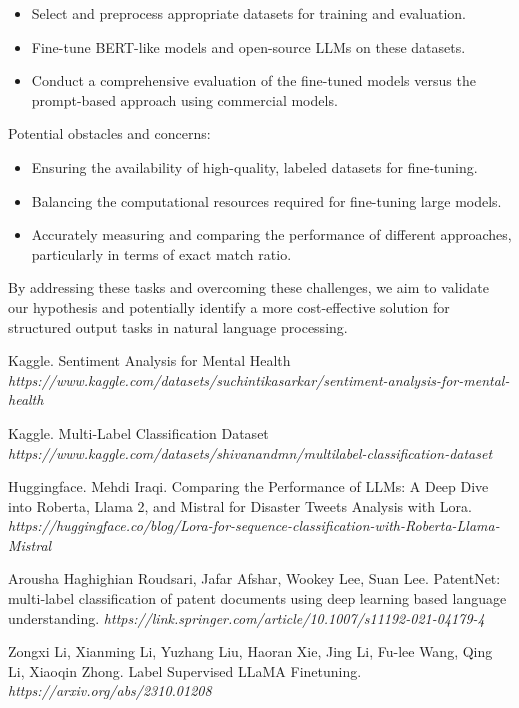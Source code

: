 \documentclass[11pt]{article}
\begin{document}
\begin{itemize}
    \item Select and preprocess appropriate datasets for training and evaluation.
    \item Fine-tune BERT-like models and open-source LLMs on these datasets.
    \item Conduct a comprehensive evaluation of the fine-tuned models versus the prompt-based approach using commercial models.
\end{itemize}
Potential obstacles and concerns:

\begin{itemize}
    \item Ensuring the availability of high-quality, labeled datasets for fine-tuning.
    \item Balancing the computational resources required for fine-tuning large models.
    \item Accurately measuring and comparing the performance of different approaches, particularly in terms of exact match ratio.
\end{itemize}
By addressing these tasks and overcoming these challenges, we aim to validate our hypothesis and potentially identify a more cost-effective solution for structured output tasks in natural language processing.

\begin{thebibliography}{}

Kaggle. Sentiment Analysis for Mental Health \textit{https://www.kaggle.com/datasets/suchintikasarkar/sentiment-analysis-for-mental-health}

Kaggle.
Multi-Label Classification Dataset \textit{https://www.kaggle.com/datasets/shivanandmn/multilabel-classification-dataset}

Huggingface.
Mehdi Iraqi. Comparing the Performance of LLMs: A Deep Dive into Roberta, Llama 2, and Mistral for Disaster Tweets Analysis with Lora.
\textit{https://huggingface.co/blog/Lora-for-sequence-classification-with-Roberta-Llama-Mistral}

Arousha Haghighian Roudsari, Jafar Afshar, Wookey Lee, Suan Lee.
PatentNet: multi‑label classification of patent documents
using deep learning based language understanding.
\textit{https://link.springer.com/article/10.1007/s11192-021-04179-4}

Zongxi Li, Xianming Li, Yuzhang Liu, Haoran Xie, Jing Li, Fu-lee Wang, Qing Li, Xiaoqin Zhong. Label Supervised LLaMA Finetuning.
\textit{https://arxiv.org/abs/2310.01208}

\end{thebibliography}
\end{document}
